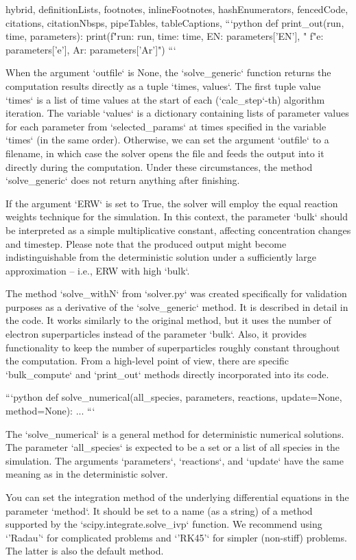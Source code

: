 \begin{markdown*}{%
  hybrid,
  definitionLists,
  footnotes,
  inlineFootnotes,
  hashEnumerators,
  fencedCode,
  citations,
  citationNbsps,
  pipeTables,
  tableCaptions,
}
```python
def print_out(run, time, parameters):
    print(f"run: {run}, time: {time}, EN: {parameters['EN']}, "
          f"e: {parameters['e']}, Ar: {parameters['Ar']}")
```

When the argument `outfile` is None, the `solve_generic` function returns the computation results directly as a tuple `times, values`. The first tuple value `times` is a list of time values at the start of each (`calc_step`-th) algorithm iteration. The variable `values` is a dictionary containing lists of parameter values for each parameter from `selected_params` at times specified in the variable
`times` (in the same order). Otherwise, we can set the argument `outfile` to a filename, in which case the solver opens the file and feeds the output into it directly during the computation. Under these circumstances, the method `solve_generic` does not return anything after finishing.


If the argument `ERW` is set to True, the solver will employ the equal reaction weights technique for the simulation. In this context, the parameter `bulk` should be interpreted as a simple multiplicative constant, affecting concentration changes and timestep. Please note that the produced output might become indistinguishable from the deterministic solution under a sufficiently large approximation -- i.e., ERW with high `bulk`.

The method `solve_withN` from `solver.py` was created specifically for validation purposes as a derivative of the `solve_generic` method. It is described in detail in the code. It works similarly to the original method, but it uses the number of electron superparticles instead of the parameter `bulk`. Also, it provides functionality to keep the number of superparticles roughly constant throughout the computation. From a high-level point of view, there are specific `bulk_compute` and `print_out` methods directly incorporated into its code.


```python
def solve_numerical(all_species, parameters, reactions, update=None, 
                    method=None):
    ...
```

The `solve_numerical` is a general method for deterministic numerical solutions. The parameter `all_species` is expected to be a set or a list of all species in the simulation. The arguments `parameters`, `reactions`, and `update` have the same meaning as in the deterministic solver.

You can set the integration method of the underlying differential equations in the parameter `method`. It should be set to a name (as a string) of a method supported by the `scipy.integrate.solve_ivp` function. We recommend using `'Radau'` for complicated problems and `'RK45'` for simpler (non-stiff) problems. The latter is also the default method.


\end{markdown*}
